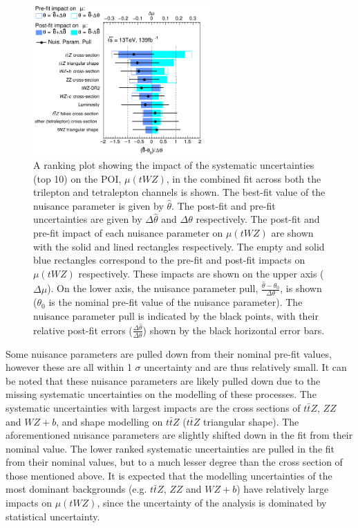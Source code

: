 \begin{figure}[h!]
    \centering
    \includegraphics[width=0.6\textwidth]{figures/combined/RankingSysts_SigXsecOverSM_systs.png}
    \caption{A ranking plot showing the impact of the systematic uncertainties (top 10) on the POI, $\mu (tWZ)$, in the combined fit across both the trilepton and tetralepton channels is shown. The best-fit value of the nuisance parameter is given by $\hat{\theta}$. The post-fit and pre-fit uncertainties are given by $\Delta \hat{\theta}$ and $\Delta\theta$ respectively. The post-fit and pre-fit impact of each nuisance parameter on $\mu (tWZ)$ are shown with the solid and lined rectangles respectively. The empty and solid blue rectangles correspond to the pre-fit and post-fit impacts on $\mu (tWZ)$ respectively. These impacts are shown on the upper axis ($\Delta \mu$). On the lower axis, the nuisance parameter pull, $\frac{\hat{\theta} - \theta_{0}}{\Delta{\theta}}$, is shown ($\theta_{0}$ is the nominal pre-fit value of the nuisance parameter). The nuisance parameter pull is indicated by the black points, with their relative post-fit errors ($\frac{\Delta \hat{\theta}}{\Delta \theta}$) shown by the black horizontal error bars.}
    \label{fig:4lep-combined-nuisance-ranking}
\end{figure}Some nuisance parameters are pulled down from their nominal pre-fit values, however these are all within 1 $\sigma$ uncertainty and are thus relatively small. It can be noted that these nuisance parameters are likely pulled down due to the missing systematic uncertainties on the modelling of these processes. The systematic uncertainties with largest impacts are the cross sections of $t\bar{t}Z$, $ZZ$ and $WZ+b$, and shape modelling on $t\bar{t}Z$ ($t\bar{t}Z$ triangular shape). The aforementioned nuisance parameters are slightly shifted down in the fit from their nominal value. The lower ranked systematic uncertainties are pulled in the fit from their nominal values, but to a much lesser degree than the cross section of those mentioned above. It is expected that the modelling uncertainties of the most dominant backgrounds (e.g. $t\bar{t}Z$, $ZZ$ and $WZ+b$) have relatively large impacts on $\mu(tWZ)$, since the uncertainty of the analysis is dominated by statistical uncertainty.

